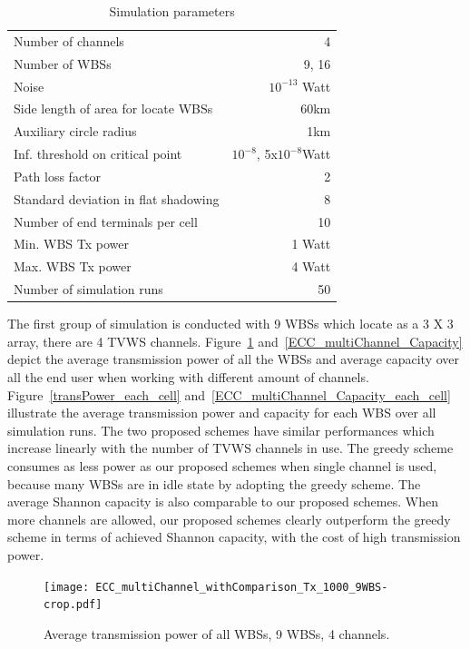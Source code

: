 \documentclass[times]{ettauth}
\theoremstyle{mytheoremstyle}
\theoremstyle{mytheoremstyle}
\theoremstyle{mytheoremstyle}
\begin{document}
\begin{table}[!h]
\centering
\begin{tabular}{|l|r|}
  \hline
  Number of channels 						& 4 \\
  Number of WBSs							& 9, 16\\
  Noise 									& $10^{-13}$ Watt \\ %
  Side length of area for locate WBSs		& 60km\\
  Auxiliary circle radius 	& 1km \\
  Inf. threshold on critical point 		& $10^{-8}$, 5x$10^{-8}$Watt \\ %
  Path loss factor 							& 2 \\
  Standard deviation in flat shadowing		& 8\\
  Number of end terminals per cell 		& 10 \\
  Min. WBS Tx power 			& 1 Watt \\
  Max. WBS Tx power			& 4 Watt \\
  Number of simulation runs & 50 \\

  \hline
\end{tabular}
\caption{Simulation parameters}
\label{simulationparameter}
\end{table}



The first group of simulation is conducted with 9 WBSs which locate as a 3 X 3 array, there are 4 TVWS channels.
Figure~\ref{transPower} and~\ref{ECC_multiChannel_Capacity} depict the average transmission power of all the WBSs and average capacity over all the end user when working with different amount of channels.
Figure~\ref{transPower_each_cell} and~\ref{ECC_multiChannel_Capacity_each_cell} illustrate the average transmission power and capacity for each WBS over all simulation runs. 
The two proposed schemes have similar performances which increase linearly with the number of TVWS channels in use.
The greedy scheme consumes as less power as our proposed schemes when single channel is used, because many WBSs are in idle state by adopting the greedy scheme.
The average Shannon capacity is also comparable to our proposed schemes.
When more channels are allowed, our proposed schemes clearly outperform the greedy scheme in terms of achieved Shannon capacity, with the cost of high transmission power.

 \begin{figure}[h!]
    \centering
      \texttt{[image: ECC\_multiChannel\_withComparison\_Tx\_1000\_9WBS-crop.pdf]}
    \caption{Average transmission power of all WBSs, 9 WBSs, 4 channels.}
\label{transPower}    
  \end{figure}
  
\end{document}
